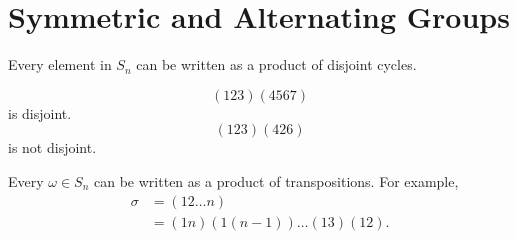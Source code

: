 
\section{Symmetric and Alternating Groups}

\begin{theorem*}{
    Every element in $S_n$ can be written as a product of disjoint cycles.
}
\end{theorem*}

\[
    (123)(4567)
\]
is disjoint.
\[
    (123)(426)
\]
is not disjoint.

\begin{theorem}{
    Every $\omega\in S_n$ can be written as a product of transpositions.
}
    For example,
    \begin{align*}
        \sigma &= (12\dots n) \\
        &= (1n)(1(n-1))\dots(13)(12).
    \end{align*}
\end{theorem}

